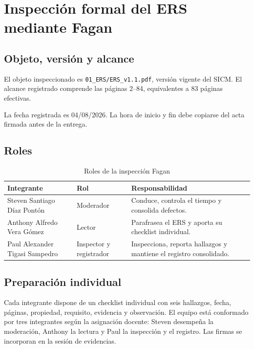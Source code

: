 \documentclass[11pt,a4paper]{article}
\begin{document}
	\section{Inspección formal del ERS mediante Fagan}
	\subsection{Objeto, versión y alcance}
	El objeto inspeccionado es \texttt{01\_ERS/ERS\_v1.1.pdf}, versión vigente del SICM. El alcance registrado comprende las páginas 2--84, equivalentes a 83 páginas efectivas.
	
	La fecha registrada es 04/08/2026. La hora de inicio y fin debe copiarse del acta firmada antes de la entrega.
	
	\subsection{Roles}
	\begin{table}[H]
		\centering
		\caption{Roles de la inspección Fagan}
		\begin{tabularx}{\textwidth}{p{3.3cm}p{3.1cm}X}
			\toprule
			\textbf{Integrante} & \textbf{Rol} & \textbf{Responsabilidad}\\
			\midrule
			Steven Santiago Díaz Pontón & Moderador & Conduce, controla el tiempo y consolida defectos.\\
			Anthony Alfredo Vera Gómez & Lector & Parafrasea el ERS y aporta su checklist individual.\\
			Paul Alexander Tigasi Sampedro & Inspector y registrador & Inspecciona, reporta hallazgos y mantiene el registro consolidado.\\
			\bottomrule
		\end{tabularx}
	\end{table}
	
	\subsection{Preparación individual}
	Cada integrante dispone de un checklist individual con seis hallazgos, fecha, páginas, propiedad, requisito, evidencia y observación. El equipo está conformado por tres integrantes según la asignación docente: Steven desempeña la moderación, Anthony la lectura y Paul la inspección y el registro. Las firmas se incorporan en la sesión de evidencias.
	
\end{document}
